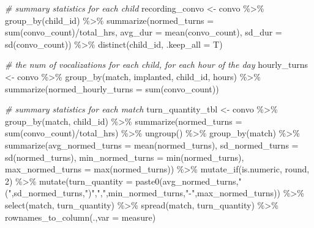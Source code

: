 \documentclass[
]{article}
\newenvironment{Shaded}{\begin{snugshade}}{\end{snugshade}}
\newcommand{\AttributeTok}[1]{\textcolor[rgb]{0.77,0.63,0.00}{#1}}
\newcommand{\CommentTok}[1]{\textcolor[rgb]{0.56,0.35,0.01}{\textit{#1}}}
\newcommand{\DecValTok}[1]{\textcolor[rgb]{0.00,0.00,0.81}{#1}}
\newcommand{\FunctionTok}[1]{\textcolor[rgb]{0.00,0.00,0.00}{#1}}
\newcommand{\NormalTok}[1]{#1}
\newcommand{\OtherTok}[1]{\textcolor[rgb]{0.56,0.35,0.01}{#1}}
\newcommand{\SpecialCharTok}[1]{\textcolor[rgb]{0.00,0.00,0.00}{#1}}
\newcommand{\StringTok}[1]{\textcolor[rgb]{0.31,0.60,0.02}{#1}}
\begin{document}
\begin{Shaded}
\begin{Highlighting}[]
\CommentTok{\# summary statistics for each child }
\NormalTok{recording\_convo }\OtherTok{\textless{}{-}}\NormalTok{ convo }\SpecialCharTok{\%\textgreater{}\%}
  \FunctionTok{group\_by}\NormalTok{(child\_id) }\SpecialCharTok{\%\textgreater{}\%}
  \FunctionTok{summarize}\NormalTok{(}\AttributeTok{normed\_turns =} \FunctionTok{sum}\NormalTok{(convo\_count)}\SpecialCharTok{/}\NormalTok{total\_hrs,}
            \AttributeTok{avg\_dur =} \FunctionTok{mean}\NormalTok{(convo\_count),}
            \AttributeTok{sd\_dur =} \FunctionTok{sd}\NormalTok{(convo\_count)) }\SpecialCharTok{\%\textgreater{}\%}
  \FunctionTok{distinct}\NormalTok{(child\_id, }\AttributeTok{.keep\_all =}\NormalTok{ T)}

\CommentTok{\# the num of vocalizations for each child, for each hour of the day}
\NormalTok{hourly\_turns }\OtherTok{\textless{}{-}}\NormalTok{ convo }\SpecialCharTok{\%\textgreater{}\%}
  \FunctionTok{group\_by}\NormalTok{(match, implanted, child\_id, hours) }\SpecialCharTok{\%\textgreater{}\%} 
  \FunctionTok{summarize}\NormalTok{(}\AttributeTok{normed\_hourly\_turns =} \FunctionTok{sum}\NormalTok{(convo\_count))}

\CommentTok{\# summary statistics for each match }
\NormalTok{turn\_quantity\_tbl }\OtherTok{\textless{}{-}}\NormalTok{ convo }\SpecialCharTok{\%\textgreater{}\%}
  \FunctionTok{group\_by}\NormalTok{(match, child\_id) }\SpecialCharTok{\%\textgreater{}\%}
  \FunctionTok{summarize}\NormalTok{(}\AttributeTok{normed\_turns =} \FunctionTok{sum}\NormalTok{(convo\_count)}\SpecialCharTok{/}\NormalTok{total\_hrs) }\SpecialCharTok{\%\textgreater{}\%}
  \FunctionTok{ungroup}\NormalTok{() }\SpecialCharTok{\%\textgreater{}\%}
  \FunctionTok{group\_by}\NormalTok{(match) }\SpecialCharTok{\%\textgreater{}\%}
  \FunctionTok{summarize}\NormalTok{(}\AttributeTok{avg\_normed\_turns =} \FunctionTok{mean}\NormalTok{(normed\_turns),}
            \AttributeTok{sd\_normed\_turns =} \FunctionTok{sd}\NormalTok{(normed\_turns),}
            \AttributeTok{min\_normed\_turns =} \FunctionTok{min}\NormalTok{(normed\_turns),}
            \AttributeTok{max\_normed\_turns =} \FunctionTok{max}\NormalTok{(normed\_turns)) }\SpecialCharTok{\%\textgreater{}\%}
  \FunctionTok{mutate\_if}\NormalTok{(is.numeric, round, }\DecValTok{2}\NormalTok{) }\SpecialCharTok{\%\textgreater{}\%}
  \FunctionTok{mutate}\NormalTok{(}\AttributeTok{turn\_quantity =} \FunctionTok{paste0}\NormalTok{(avg\_normed\_turns,}\StringTok{"("}\NormalTok{,sd\_normed\_turns,}\StringTok{")"}\NormalTok{,}\StringTok{","}\NormalTok{,min\_normed\_turns,}\StringTok{"{-}"}\NormalTok{,max\_normed\_turns)) }\SpecialCharTok{\%\textgreater{}\%}
  \FunctionTok{select}\NormalTok{(match, turn\_quantity) }\SpecialCharTok{\%\textgreater{}\%}
  \FunctionTok{spread}\NormalTok{(match, turn\_quantity) }\SpecialCharTok{\%\textgreater{}\%}
  \FunctionTok{rownames\_to\_column}\NormalTok{(.,}\AttributeTok{var =} \StringTok{\textquotesingle{}measure\textquotesingle{}}\NormalTok{)}
\end{Highlighting}
\end{Shaded}
\end{document}
